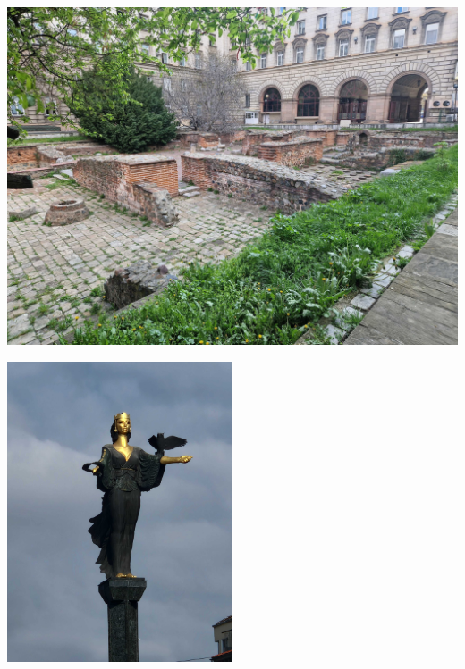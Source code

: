 \documentclass[11pt]{article}
\begin{document}
\begin{center}
\includegraphics[width=1.0\textwidth]{images/20230421_092814.jpg}
\end{center}

\begin{center}
\includegraphics[width=0.5\textwidth]{images/20230421_093521.jpg}
\end{center}
\end{document}
